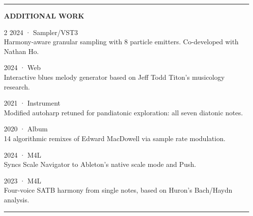 \documentclass[10pt]{article}
\newcommand{\sectionline}{\vspace{0.3em}\hrule\vspace{0.6em}}
\begin{document}
\sectionline

{\large\bfseries ADDITIONAL WORK}
\vspace{0.4em}

\begin{multicols}{2}
 {\scriptsize\color{muted} 2024 · Sampler/VST3}\\
{\scriptsize Harmony-aware granular sampling with 8 particle emitters. Co-developed with Nathan Ho.}

\vspace{0.5em}
 {\scriptsize\color{muted} 2024 · Web}\\
{\scriptsize Interactive blues melody generator based on Jeff Todd Titon's musicology research.}

\vspace{0.5em}
 {\scriptsize\color{muted} 2021 · Instrument}\\
{\scriptsize Modified autoharp retuned for pandiatonic exploration: all seven diatonic notes.}

\columnbreak

 {\scriptsize\color{muted} 2020 · Album}\\
{\scriptsize 14 algorithmic remixes of Edward MacDowell via sample rate modulation.}

\vspace{0.5em}
 {\scriptsize\color{muted} 2024 · M4L}\\
{\scriptsize Syncs Scale Navigator to Ableton's native scale mode and Push.}

\vspace{0.5em}
 {\scriptsize\color{muted} 2023 · M4L}\\
{\scriptsize Four-voice SATB harmony from single notes, based on Huron's Bach/Haydn analysis.}
\end{multicols}

\sectionline
\end{document}

